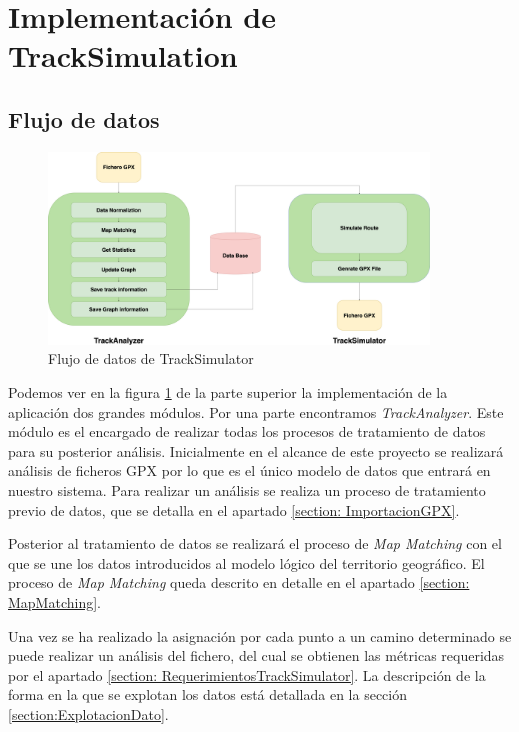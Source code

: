 \section{Implementación de TrackSimulation}
\subsection{Flujo de datos}

\begin{figure}[htb]
\begin{center}
\includegraphics[width=0.9\textwidth]{./Imagenes/TrackSimulatorDataFlow.png}
\caption{Flujo de datos de TrackSimulator}
\label{TrackSimulatorDataFlow}
\end{center}
\end{figure}

Podemos ver en la figura \ref{TrackSimulatorDataFlow} de la parte superior la implementación de la aplicación 
dos grandes módulos. Por una parte encontramos \textit{TrackAnalyzer}. Este módulo es el encargado de 
realizar todas los procesos de tratamiento de datos para su posterior análisis. Inicialmente en el alcance de 
este proyecto se realizará análisis de ficheros \ac{GPX} por lo que es el único modelo de datos que entrará en 
nuestro sistema. Para realizar un análisis se realiza un proceso de tratamiento previo de datos, que se detalla 
en el apartado \ref{section: ImportacionGPX}.

Posterior al tratamiento de datos se realizará el proceso de \textit{Map Matching} con el que se une los datos 
introducidos al modelo lógico del territorio geográfico. El proceso de \textit{Map Matching} queda descrito 
en detalle en el apartado \ref{section: MapMatching}.

Una vez se ha realizado la asignación por cada punto a un camino determinado se puede realizar un análisis 
del fichero, del cual se obtienen las métricas requeridas por el apartado 
\ref{section: RequerimientosTrackSimulator}. La descripción de la forma en la que se explotan los datos está
detallada en la sección \ref{section:ExplotacionDato}.

